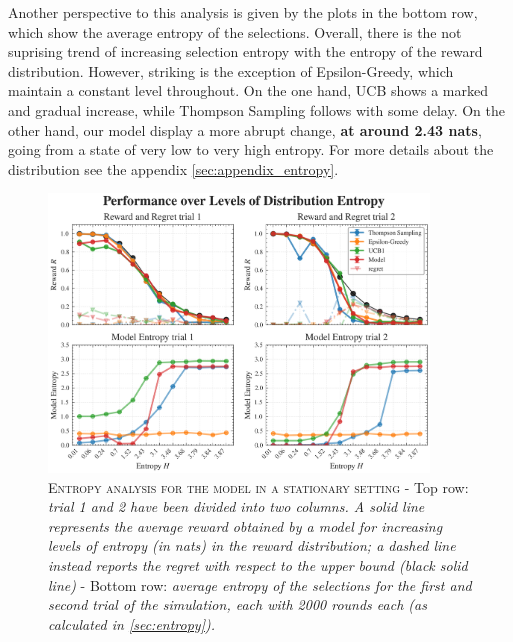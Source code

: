 Another perspective to this analysis is given by the plots in the bottom row, which show the average entropy of the selections.
Overall, there is the not suprising trend of increasing selection entropy with the entropy of the reward distribution. However, striking is the exception of Epsilon-Greedy, which maintain a constant level throughout.
On the one hand, UCB shows a marked and gradual increase, while Thompson Sampling follows with some delay.
On the other hand, our model display a more abrupt change, \textbf{at around 2.43 nats}, going from a state of very low to very high entropy.
For more details about the distribution see the appendix \ref{sec:appendix_entropy}.


\begin{figure}[H]
    \centering
    \includegraphics[width=0.9\textwidth]{figures/entropy_performance_plot.png}
    \caption{\textsc{Entropy analysis for the model in a stationary setting} - Top row: \textit{trial 1 and 2 have been divided into two columns. A solid line represents the average reward obtained by a model for increasing levels of entropy (in nats) in the reward distribution; a dashed line instead reports the regret with respect to the upper bound (black solid line) }
- Bottom row: \textit{average entropy of the selections for the first and second trial of the simulation, each with 2000 rounds each (as calculated in \ref{sec:entropy}).}}
\end{figure}\label{fig:entropy_distr}




